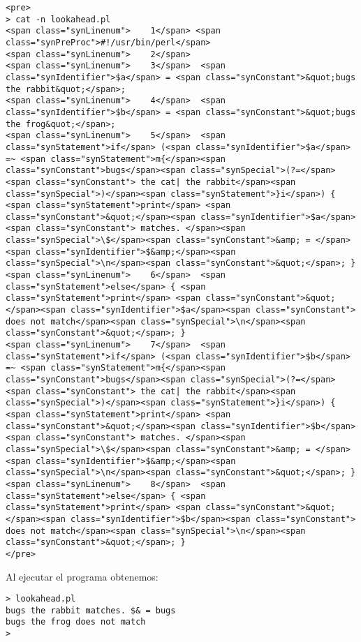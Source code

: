 \begin{it}
\begin{verbatim}
<pre>
> cat -n lookahead.pl
<span class="synLinenum">    1</span> <span class="synPreProc">#!/usr/bin/perl</span>
<span class="synLinenum">    2</span> 
<span class="synLinenum">    3</span>  <span class="synIdentifier">$a</span> = <span class="synConstant">&quot;bugs the rabbit&quot;</span>;
<span class="synLinenum">    4</span>  <span class="synIdentifier">$b</span> = <span class="synConstant">&quot;bugs the frog&quot;</span>;
<span class="synLinenum">    5</span>  <span class="synStatement">if</span> (<span class="synIdentifier">$a</span> =~ <span class="synStatement">m{</span><span class="synConstant">bugs</span><span class="synSpecial">(?=</span><span class="synConstant"> the cat| the rabbit</span><span class="synSpecial">)</span><span class="synStatement">}i</span>) { <span class="synStatement">print</span> <span class="synConstant">&quot;</span><span class="synIdentifier">$a</span><span class="synConstant"> matches. </span><span class="synSpecial">\$</span><span class="synConstant">&amp; = </span><span class="synIdentifier">$&amp;</span><span class="synSpecial">\n</span><span class="synConstant">&quot;</span>; }
<span class="synLinenum">    6</span>  <span class="synStatement">else</span> { <span class="synStatement">print</span> <span class="synConstant">&quot;</span><span class="synIdentifier">$a</span><span class="synConstant"> does not match</span><span class="synSpecial">\n</span><span class="synConstant">&quot;</span>; }
<span class="synLinenum">    7</span>  <span class="synStatement">if</span> (<span class="synIdentifier">$b</span> =~ <span class="synStatement">m{</span><span class="synConstant">bugs</span><span class="synSpecial">(?=</span><span class="synConstant"> the cat| the rabbit</span><span class="synSpecial">)</span><span class="synStatement">}i</span>) { <span class="synStatement">print</span> <span class="synConstant">&quot;</span><span class="synIdentifier">$b</span><span class="synConstant"> matches. </span><span class="synSpecial">\$</span><span class="synConstant">&amp; = </span><span class="synIdentifier">$&amp;</span><span class="synSpecial">\n</span><span class="synConstant">&quot;</span>; }
<span class="synLinenum">    8</span>  <span class="synStatement">else</span> { <span class="synStatement">print</span> <span class="synConstant">&quot;</span><span class="synIdentifier">$b</span><span class="synConstant"> does not match</span><span class="synSpecial">\n</span><span class="synConstant">&quot;</span>; }
</pre>

\end{verbatim}
Al ejecutar el programa obtenemos:
\begin{verbatim}
> lookahead.pl
bugs the rabbit matches. $& = bugs
bugs the frog does not match
>
\end{verbatim}


\end{it}
